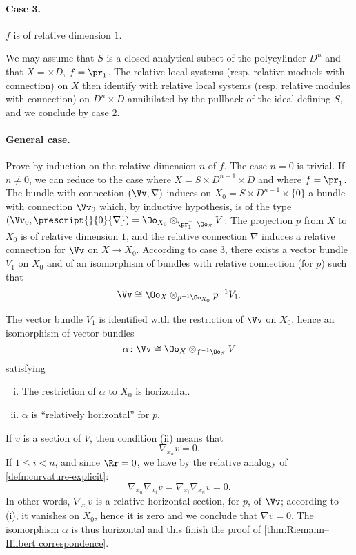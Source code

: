 \begin{subpara}
  \paragraph{Case 3.}
  $f$ is of relative dimension $1$.

  We may assume that $S$ is a closed analytical subset of the polycylinder $D^n$
  and that $X=\times D$, $f=\pr_1$. The relative local systems (resp. relative
  moduels with connection) on $X$ then identify with relative local systems
  (resp. relative modules with connection) on $D^n\times D$ annihilated by the
  pullback of the ideal defining $S$, and we conclude by case 2.

  \paragraph{General case.}
  Prove by induction on the relative dimension $n$ of $f$.
  The case $n=0$ is trivial. If $n\neq0$, we can reduce to the case where
  $X=S\times D^{n-1}\times D$ and where $f=\pr_1$.
  The bundle with connection $(\Vv,\nabla)$ induces on
  $X_0=S\times D^{n-1}\times\{ 0 \}$ a bundle with connection $\Vv_0$ which,
  by inductive hypothesis, is of the type $(\Vv_0,\prescript{}{0}{\nabla}) =
  \Oo_{X_0}\otimes_{\pr_1^{-1}\Oo_S}V$. The projection $p$ from $X$ to $X_0$ is
  of relative dimension $1$, and the relative connection $\nabla$ induces a
  relative connection for $\Vv$ on $X\to X_0$.
  According to case 3, there exists a vector bundle $V_1$ on $X_0$ and of an
  isomorphism of bundles with relative connection (for $p$) such that
  \[
  \Vv\cong\Oo_X\otimes_{p^{-1}\Oo_{X_0}}p^{-1}V_1.
  \]

  The vector bundle $V_1$ is identified with the restriction of $\Vv$ on $X_0$,
  hence an isomorphism of vector bundles
  \[
  \alpha\colon\Vv\cong\Oo_X\otimes_{f^{-1}\Oo_S}V
  \]
  satisfying
  \begin{enumerate}[(i)]
    \item The restriction of $\alpha$ to $X_0$ is horizontal.
    \item $\alpha$ is ``relatively horizontal'' for $p$.
  \end{enumerate}

  If $v$ is a section of $V$, then condition (ii) means that
  \[
  \nabla_{x_n}v=0.
  \]
  If $1\le i<n$, and since $\Rr=0$, we have by the relative analogy of
  \ref{defn:curvature-explicit}:
  \[
  \nabla_{x_n}\nabla_{x_i}v = \nabla_{x_i}\nabla_{x_n}v = 0.
  \]
  In other words, $\nabla_{x_i}v$ is a relative horizontal section, for $p$, of
  $\Vv$; according to (i), it vanishes on $X_0$, hence it is zero and we conclude
  that $\nabla v=0$. The isomorphism $\alpha$ is thus horizontal and this finish
  the proof of \ref{thm:Riemann–Hilbert correspondence}.
\end{subpara}

